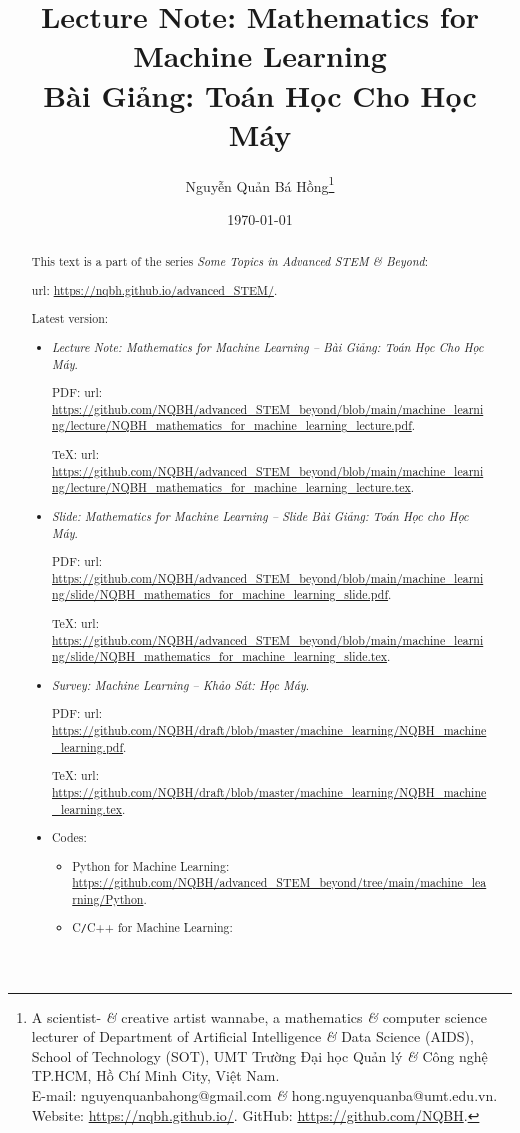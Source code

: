 \documentclass{article}
\title{Lecture Note: Mathematics for Machine Learning\\Bài Giảng: Toán Học Cho Học Máy}
\author{Nguyễn Quản Bá Hồng\footnote{A scientist- {\it\&} creative artist wannabe, a mathematics {\it\&} computer science lecturer of Department of Artificial Intelligence {\it\&} Data Science (AIDS), School of Technology (SOT), UMT Trường Đại học Quản lý {\it\&} Công nghệ TP.HCM, Hồ Chí Minh City, Việt Nam.\\E-mail: {\sf nguyenquanbahong@gmail.com} {\it\&} {\sf hong.nguyenquanba@umt.edu.vn}. Website: \url{https://nqbh.github.io/}. GitHub: \url{https://github.com/NQBH}.}}
\date{\today}
\begin{document}
\maketitle
\begin{abstract}
	This text is a part of the series {\it Some Topics in Advanced STEM \& Beyond}:
	
	{\sc url}: \url{https://nqbh.github.io/advanced_STEM/}.
	
	Latest version:
	\begin{itemize}
		\item {\it Lecture Note: Mathematics for Machine Learning -- Bài Giảng: Toán Học Cho Học Máy}.
		
		PDF: {\sc url}: \url{https://github.com/NQBH/advanced_STEM_beyond/blob/main/machine_learning/lecture/NQBH_mathematics_for_machine_learning_lecture.pdf}.
		
		\TeX: {\sc url}: \url{https://github.com/NQBH/advanced_STEM_beyond/blob/main/machine_learning/lecture/NQBH_mathematics_for_machine_learning_lecture.tex}.
		\item {\it Slide: Mathematics for Machine Learning -- Slide Bài Giảng: Toán Học cho Học Máy}.
		
		PDF: {\sc url}: \url{https://github.com/NQBH/advanced_STEM_beyond/blob/main/machine_learning/slide/NQBH_mathematics_for_machine_learning_slide.pdf}.
		
		\TeX: {\sc url}: \url{https://github.com/NQBH/advanced_STEM_beyond/blob/main/machine_learning/slide/NQBH_mathematics_for_machine_learning_slide.tex}.
		\item {\it Survey: Machine Learning -- Khảo Sát: Học Máy}.
		
		PDF: {\sc url}: \url{https://github.com/NQBH/draft/blob/master/machine_learning/NQBH_machine_learning.pdf}.
		
		\TeX: {\sc url}: \url{https://github.com/NQBH/draft/blob/master/machine_learning/NQBH_machine_learning.tex}.
		\item Codes:
		\begin{itemize}
			\item Python for Machine Learning: \url{https://github.com/NQBH/advanced_STEM_beyond/tree/main/machine_learning/Python}.
			\item C{\tt/}C++ for Machine Learning:
		\end{itemize}
	\end{itemize}
\end{abstract}
\tableofcontents

\end{document}
